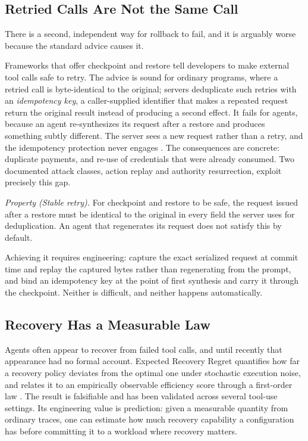 \documentclass[11pt]{book}
\begin{document}
\subsection{Retried Calls Are Not the Same Call}

There is a second, independent way for rollback to fail, and it is arguably worse because the standard advice causes it.

Frameworks that offer checkpoint and restore tell developers to make external tool calls safe to retry. The advice is sound for ordinary programs, where a retried call is byte-identical to the original; servers deduplicate such retries with an \emph{idempotency key}, a caller-supplied identifier that makes a repeated request return the original result instead of producing a second effect. It fails for agents, because an agent re-synthesizes its request after a restore and produces something subtly different. The server sees a new request rather than a retry, and the idempotency protection never engages \cite{acrfence2026}. The consequences are concrete: duplicate payments, and re-use of credentials that were already consumed. Two documented attack classes, action replay and authority resurrection, exploit precisely this gap.

\textit{Property (Stable retry).} For checkpoint and restore to be safe, the request issued after a restore must be identical to the original in every field the server uses for deduplication. An agent that regenerates its request does not satisfy this by default.

Achieving it requires engineering: capture the exact serialized request at commit time and replay the captured bytes rather than regenerating from the prompt, and bind an idempotency key at the point of first synthesis and carry it through the checkpoint. Neither is difficult, and neither happens automatically.

\subsection{Recovery Has a Measurable Law}

Agents often appear to recover from failed tool calls, and until recently that appearance had no formal account. Expected Recovery Regret quantifies how far a recovery policy deviates from the optimal one under stochastic execution noise, and relates it to an empirically observable efficiency score through a first-order law \cite{recoverlaw2026}. The result is falsifiable and has been validated across several tool-use settings. Its engineering value is prediction: given a measurable quantity from ordinary traces, one can estimate how much recovery capability a configuration has before committing it to a workload where recovery matters.
\end{document}
